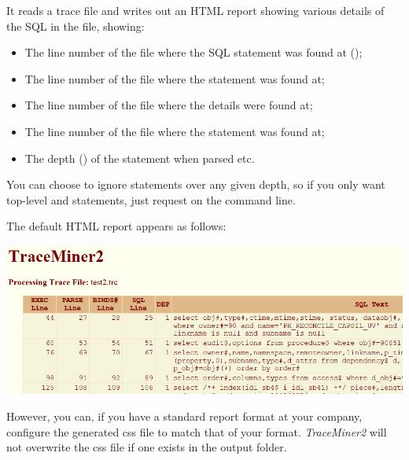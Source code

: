 \begin{appendix}
It reads a trace file and writes out an HTML report showing various
details of the SQL in the file, showing:

\begin{itemize}
\tightlist
\item
  The line number of the file where the SQL statement was found at
  ();
\item
  The line number of the file where  the  statement was found at;
\item
  The line number of the file where  the  details were found at;
\item
  The line number of the file where  the  statement was found at;
\item
  The depth () of the statement when parsed etc.
\end{itemize}

You can choose to ignore statements over any given depth, so if you only
want top-level and  statements, just request  on the
command line. 

The default HTML report appears as follows:

\includegraphics[width=\textwidth]{Content/images/TraceMiner2.png}

However, you can, if you have a standard report format at your company,
configure the generated css file to match that of your format.
\emph{TraceMiner2} will not overwrite the css file if one exists in the
output folder.



\end{appendix}
